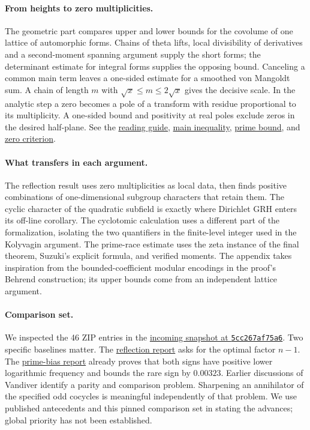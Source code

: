 \documentclass[11pt,letterpaper]{article}
\newcommand{\src}[2]{\href{https://github.com/lsernau/grh-lean/blob/72fead102f663d5c7a407964a13dc0cf9d977207/grh/src/#1}{#2}}
\newcommand{\repo}[2]{\href{https://github.com/lsernau/grh-lean/blob/72fead102f663d5c7a407964a13dc0cf9d977207/#1}{#2}}
\newcommand{\incoming}[2]{\href{https://github.com/VladimirReshetnikov/ProveIt/blob/5cc267af75a635199ac5d93a7d49cbce521daefc/docs/incoming/#1}{#2}}
\begin{document}
\paragraph{From heights to zero multiplicities.}
The geometric part compares upper and lower bounds for the covolume of
one lattice of automorphic forms. Chains of theta lifts, local
divisibility of derivatives and a second-moment spanning argument supply
the short forms; the determinant estimate for integral forms supplies
the opposing bound. Canceling a common main term leaves a one-sided
estimate for a smoothed von Mangoldt sum. A chain of length $m$ with
$\sqrt x\le m\le2\sqrt x$ gives the decisive scale. In the analytic
step a zero becomes a pole of a transform with residue proportional to
its multiplicity. A one-sided bound and positivity at real poles exclude
zeros in the desired half-plane. See the
\repo{grh/GUIDE.md}{reading guide},
\src{New/Reduction/MainInequality.lean}{main inequality},
\src{New/Reduction/OneSidedBound.lean}{prime bound},
and \src{New/Reduction/Zeros/Criterion.lean}{zero criterion}.

\paragraph{What transfers in each argument.}
The reflection result uses zero multiplicities as local data, then finds
positive combinations of one-dimensional subgroup characters that retain
them. The cyclic character of the quadratic subfield is exactly where
Dirichlet GRH enters its off-line corollary. The cyclotomic calculation
uses a different part of the formalization, isolating the two quantifiers
in the finite-level integer used in the Kolyvagin argument. The prime-race
estimate uses the zeta instance of the final theorem, Suzuki's explicit
formula, and verified moments. The appendix takes inspiration from the
bounded-coefficient modular encodings in the proof's Behrend construction;
its upper bounds come from an independent lattice argument.

\paragraph{Comparison set.}
We inspected the 46 ZIP entries in the
\href{https://github.com/VladimirReshetnikov/ProveIt/tree/5cc267af75a635199ac5d93a7d49cbce521daefc/docs/incoming}{incoming snapshot at \texttt{5cc267af75a6}}.
Two specific baselines matter. The
\incoming{grh_reflection_transfer_2026-11-25.zip}{reflection report}
asks for the optimal factor $n-1$. The
\incoming{grh_cm_four_terms_and_prime_bias.zip}{prime-bias report}
already proves that both signs have positive lower logarithmic frequency
and bounds the rare sign by $0.00323$. Earlier discussions of Vandiver
identify a parity and comparison problem. Sharpening an annihilator of the
specified odd cocycles is meaningful independently of that problem.
We use published antecedents and this pinned comparison set in stating
the advances; global priority has not been established.
\clearpage

\clearpage

\clearpage

\clearpage
\end{document}
